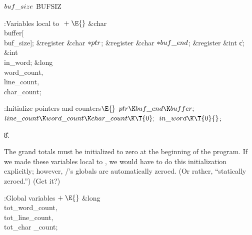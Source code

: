 \documentclass[]{article}
\begin{document}
\Y\B\4\D$\\{buf\_size}$ \5
\.{BUFSIZ}\par
\Y\B\4:Variables local to \X${}\mathrel+\E{}$\6
\&{char} \\{buffer}[\\{buf\_size}];\6
\&{register} \&{char} ${}{*}\\{ptr}{}$;\6
\&{register} \&{char} ${}{*}\\{buf\_end}{}$;\6
\&{register} \&{int} \|c;\6
\&{int} \\{in\_word};\6
\&{long} \\{word\_count}${},{}$ \\{line\_count}${},{}$ \\{char\_count};\par
\fi

\B{}:Initialize pointers and counters\X${}\E{}$\6
$\\{ptr}\K\\{buf\_end}\K\\{buffer};{}$\6
${}\\{line\_count}\K\\{word\_count}\K\\{char\_count}\K\T{0};{}$\6
${}\\{in\_word}\K\T{0}{}$;\par
\U8.\fi

The grand totals must be initialized to zero at the beginning of the
program. If we made these variables local to , we would have to
do this initialization explicitly; however, \CEE/'s globals are automatically
zeroed. (Or rather, ``statically zeroed.'') (Get it?)

\Y\B\4:Global variables\X${}\mathrel+\E{}$\6
\&{long} \\{tot\_word\_count}${},{}$ \\{tot\_line\_count}${},{}$ \\{tot\_char%
\_count};\par
\fi
\end{document}
